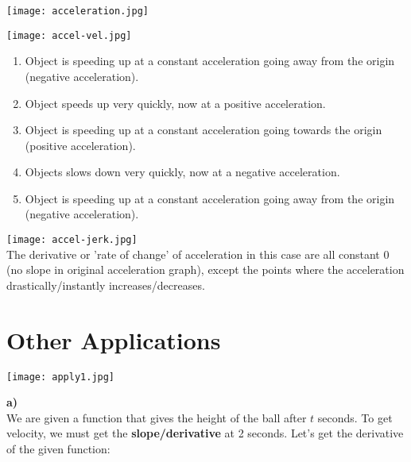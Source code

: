 \documentclass[12pt,fleqn]{book} %
\begin{document}
\begin{multicols}{2}
    \texttt{[image: acceleration.jpg]} \\
    \begin{center}

        \texttt{[image: accel-vel.jpg]}
        \begin{enumerate}[label=(\alph*)]
            \item Object is speeding up at a constant acceleration going away from the origin (negative acceleration).
            \item Object speeds up very quickly, now at a positive acceleration.
            \item Object is speeding up at a constant acceleration going towards the origin (positive acceleration).
            \item Objects slows down very quickly, now at a negative acceleration.
            \item Object is speeding up at a constant acceleration going away from the origin (negative acceleration).
        \end{enumerate}

    \end{center}
    \columnbreak

    \hspace*{-20mm}

    \begin{center}
        \vspace*{10mm}
        \texttt{[image: accel-jerk.jpg]} \\
        The derivative or 'rate of change' of acceleration in this case are all constant 0 (no slope in original acceleration graph), except the points where the acceleration drastically/instantly increases/decreases.

    \end{center}
\end{multicols}

\pagebreak


\section{Other Applications}

\texttt{[image: apply1.jpg]}

\noindent \textbf{a)} \\
We are given a function that gives the height of the ball after $t$ seconds. To get velocity, we must get the \textbf{slope/derivative} at 2 seconds. Let's get the derivative of the given function:
\end{document}
